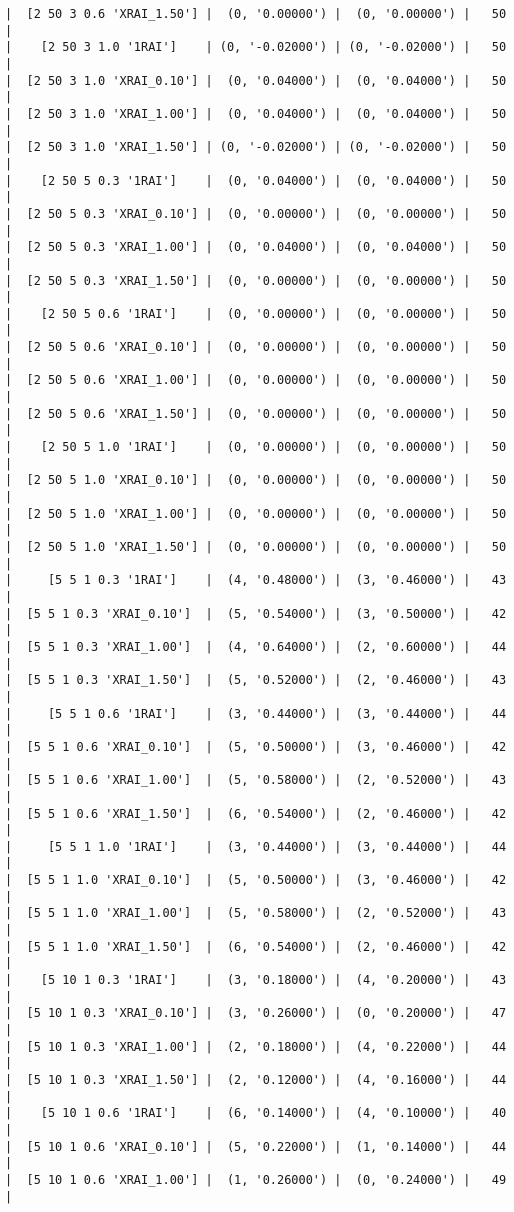 \documentclass{article}
\begin{document}
\begin{verbatim}
|  [2 50 3 0.6 'XRAI_1.50'] |  (0, '0.00000') |  (0, '0.00000') |   50  |
|    [2 50 3 1.0 '1RAI']    | (0, '-0.02000') | (0, '-0.02000') |   50  |
|  [2 50 3 1.0 'XRAI_0.10'] |  (0, '0.04000') |  (0, '0.04000') |   50  |
|  [2 50 3 1.0 'XRAI_1.00'] |  (0, '0.04000') |  (0, '0.04000') |   50  |
|  [2 50 3 1.0 'XRAI_1.50'] | (0, '-0.02000') | (0, '-0.02000') |   50  |
|    [2 50 5 0.3 '1RAI']    |  (0, '0.04000') |  (0, '0.04000') |   50  |
|  [2 50 5 0.3 'XRAI_0.10'] |  (0, '0.00000') |  (0, '0.00000') |   50  |
|  [2 50 5 0.3 'XRAI_1.00'] |  (0, '0.04000') |  (0, '0.04000') |   50  |
|  [2 50 5 0.3 'XRAI_1.50'] |  (0, '0.00000') |  (0, '0.00000') |   50  |
|    [2 50 5 0.6 '1RAI']    |  (0, '0.00000') |  (0, '0.00000') |   50  |
|  [2 50 5 0.6 'XRAI_0.10'] |  (0, '0.00000') |  (0, '0.00000') |   50  |
|  [2 50 5 0.6 'XRAI_1.00'] |  (0, '0.00000') |  (0, '0.00000') |   50  |
|  [2 50 5 0.6 'XRAI_1.50'] |  (0, '0.00000') |  (0, '0.00000') |   50  |
|    [2 50 5 1.0 '1RAI']    |  (0, '0.00000') |  (0, '0.00000') |   50  |
|  [2 50 5 1.0 'XRAI_0.10'] |  (0, '0.00000') |  (0, '0.00000') |   50  |
|  [2 50 5 1.0 'XRAI_1.00'] |  (0, '0.00000') |  (0, '0.00000') |   50  |
|  [2 50 5 1.0 'XRAI_1.50'] |  (0, '0.00000') |  (0, '0.00000') |   50  |
|     [5 5 1 0.3 '1RAI']    |  (4, '0.48000') |  (3, '0.46000') |   43  |
|  [5 5 1 0.3 'XRAI_0.10']  |  (5, '0.54000') |  (3, '0.50000') |   42  |
|  [5 5 1 0.3 'XRAI_1.00']  |  (4, '0.64000') |  (2, '0.60000') |   44  |
|  [5 5 1 0.3 'XRAI_1.50']  |  (5, '0.52000') |  (2, '0.46000') |   43  |
|     [5 5 1 0.6 '1RAI']    |  (3, '0.44000') |  (3, '0.44000') |   44  |
|  [5 5 1 0.6 'XRAI_0.10']  |  (5, '0.50000') |  (3, '0.46000') |   42  |
|  [5 5 1 0.6 'XRAI_1.00']  |  (5, '0.58000') |  (2, '0.52000') |   43  |
|  [5 5 1 0.6 'XRAI_1.50']  |  (6, '0.54000') |  (2, '0.46000') |   42  |
|     [5 5 1 1.0 '1RAI']    |  (3, '0.44000') |  (3, '0.44000') |   44  |
|  [5 5 1 1.0 'XRAI_0.10']  |  (5, '0.50000') |  (3, '0.46000') |   42  |
|  [5 5 1 1.0 'XRAI_1.00']  |  (5, '0.58000') |  (2, '0.52000') |   43  |
|  [5 5 1 1.0 'XRAI_1.50']  |  (6, '0.54000') |  (2, '0.46000') |   42  |
|    [5 10 1 0.3 '1RAI']    |  (3, '0.18000') |  (4, '0.20000') |   43  |
|  [5 10 1 0.3 'XRAI_0.10'] |  (3, '0.26000') |  (0, '0.20000') |   47  |
|  [5 10 1 0.3 'XRAI_1.00'] |  (2, '0.18000') |  (4, '0.22000') |   44  |
|  [5 10 1 0.3 'XRAI_1.50'] |  (2, '0.12000') |  (4, '0.16000') |   44  |
|    [5 10 1 0.6 '1RAI']    |  (6, '0.14000') |  (4, '0.10000') |   40  |
|  [5 10 1 0.6 'XRAI_0.10'] |  (5, '0.22000') |  (1, '0.14000') |   44  |
|  [5 10 1 0.6 'XRAI_1.00'] |  (1, '0.26000') |  (0, '0.24000') |   49  |

\end{verbatim}
\end{document}

